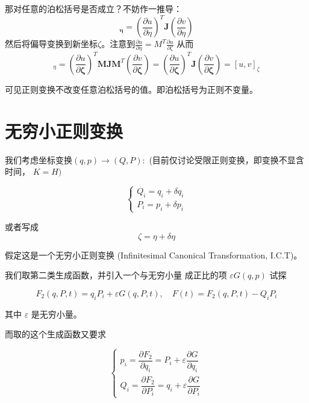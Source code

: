 \documentclass[12pt]{ctexart}
\begin{document}
那对任意的泊松括号是否成立？不妨作一推导：
\begin{equation}
    [u,v]_{\boldsymbol{\eta}}=\left(\frac{\partial u}{\partial\eta}\right)^T\boldsymbol{J}\left(\frac{\partial v}{\partial\eta}\right)
\end{equation}
然后将偏导变换到新坐标$\zeta$。注意到$\frac{\partial u}{\partial\eta}=M^T\frac{\partial u}{\partial\zeta}$
从而
\begin{equation}
    [u,v]_\eta=\left(\frac{\partial u}{\partial\boldsymbol{\zeta}}\right)^T\boldsymbol{MJM}^T\left(\frac{\partial v}{\partial\boldsymbol{\zeta}}\right)=\left(\frac{\partial u}{\partial\boldsymbol{\zeta}}\right)^T\boldsymbol{J}\left(\frac{\partial v}{\partial\boldsymbol{\zeta}}\right)=[u,v]_\zeta
\end{equation}

可见正则变换不改变任意泊松括号的值。即泊松括号为正则不变量。
\section{无穷小正则变换}

我们考虑坐标变换$( q, p) \to ( Q, P) :$ (目前仅讨论受限正则变换，即变换不显含时间， $K=H)$

\begin{equation}
\left\{
\begin{array}{l}
Q_i=q_i+\delta q_i\\
P_i=p_i+\delta p_i
\end{array}
\right.
\label{eq:27}
\end{equation}

或者写成
\begin{equation}
    \zeta=\eta+\delta\eta
    \label{eq:28}
\end{equation}

假定这是一个无穷小正则变换 (Infinitesimal Canonical Transformation, I.C.T)。

我们取第二类生成函数，并引入一个与无穷小量 成正比的项 $\varepsilon G(q,p)$ 试探

\begin{equation}
F_2(q,P,t)=q_iP_i+\varepsilon G(q,P,t),\quad F(t)=F_2(q,P,t)-Q_iP_i
\label{eq:29}
\end{equation}

其中 $\varepsilon$ 是无穷小量。

而取的这个生成函数又要求

\begin{equation}
\begin{cases}
p_i=\dfrac{\partial F_2}{\partial q_i}=P_i+\varepsilon\dfrac{\partial G}{\partial q_i}\\
Q_i=\dfrac{\partial F_2}{\partial P_i}=q_i+\varepsilon\dfrac{\partial G}{\partial P_i}
\end{cases}
\label{eq:30}
\end{equation}
\end{document}
